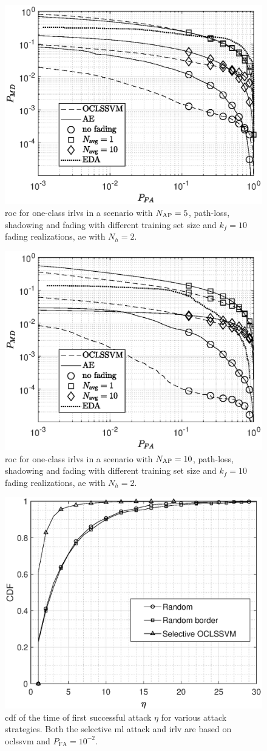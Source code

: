 \documentclass[draftcls,onecolumn,12pt]{IEEEtran}
\begin{document}
 
 
\begin{figure}[t]
    \centering
    \includegraphics[width=0.6\columnwidth]{res_Fading_5BS_oneClass.eps}
    \caption{\ac{roc} for one-class \acp{irlv} in a scenario with $N_{\rm AP}=5$, path-loss, shadowing and fading with different training set size and $k_f=10$ fading realizations,  \ac{ae} with $N_h = 2$. }
    \label{fig:kf10Oc5bs}
\end{figure}

\begin{figure}[t]
    \centering
    \includegraphics[width=0.6\columnwidth]{res_Fading_10BS_oneClass.eps}
    \caption{\ac{roc} for one-class \acp{irlv} in a scenario with $N_{\rm AP}=10$, path-loss, shadowing and fading with different training set size and $k_f=10$ fading realizations,  \ac{ae} with $N_h = 2$. }
    \label{fig:kf10Oc}
\end{figure}




\begin{figure}[t]
    \centering
    \includegraphics[width=0.6\columnwidth]{res_selective_SVM.eps}
    \caption{\ac{cdf} of the time of first successful attack $\eta$ for various attack strategies. Both the selective \ac{ml} attack  and \ac{irlv} are based on \ac{oclssvm} and $P_{\text{FA}}= 10^{-2}$.}
    \label{fig:selectiveSVM}
\end{figure}
\end{document}
